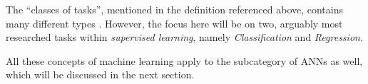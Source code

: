 \documentclass[../main.tex]{subfiles}
\begin{document}
The ``classes of tasks'', mentioned in the definition referenced above, contains many different types \cite{Goodfellow2016}.
However, the focus here will be on two, arguably most researched tasks within \textit{supervised learning}, namely \textit{Classification} and \textit{Regression}.

All these concepts of machine learning apply to the subcategory of \acp{ANN} as well, which will be discussed in the next section.


\end{document}
